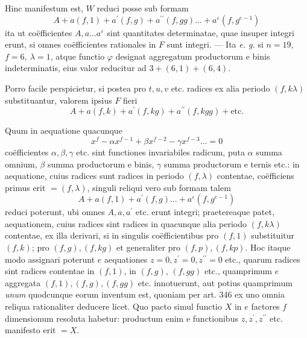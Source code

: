Hinc manifestum est, \(W\) reduci posse sub formam
\[A+a(f,1)+a^{\prime}(f,g)+a^{\prime\prime}(f,gg)\ldots+a^\varepsilon(f,g^{e-1})\] ita ut coëfficientes \(A,\allowbreak a\ldots a^\varepsilon\) sint quantitates determinatae, quae insuper integri erunt, si omnes coëfficientes rationales in \(F\) sunt integri. — Ita \textit{e. g.} si \(n=19\), \(f=6,\allowbreak \ \lambda=1\), atque functio \(\varphi\) designat aggregatum productorum e binis indeterminatis, eius valor reducitur ad \(3+(6,1)+(6,4)\).

Porro facile perspicietur, si postea pro \(t,\allowbreak u,\allowbreak v\) etc. radices ex alia periodo \((f,k\lambda)\) substituantur, valorem ipsius \(F\) fieri \[A+a(f,k)+a^{\prime}(f,kg)+a^{\prime\prime}(f,kgg)+\text{etc.}\]

Quum in aequatione quacunque \[x^f-\alpha x^{f-1}+\beta x^{f-2}-\gamma x^{f-3}\ldots=0\] coëfficientes \(\alpha,\allowbreak \beta,\allowbreak \gamma\) etc. sint functiones invariabiles radicum, puta \(\alpha\) summa omnium, \(\beta\) summa productorum e binis, \(\gamma\) summa productorum e ternis etc.: in aequatione, cuius radices sunt radices in periodo \((f,\lambda)\) contentae, coëfficiens primus erit \(=(f,\lambda)\), singuli reliqui vero sub formam talem \[A+a(f,1)+a^{\prime}(f,g)\ldots+a^\varepsilon(f,g^{e-1})\] reduci poterunt, ubi omnes \(A,\allowbreak a,\allowbreak a^{\prime}\) etc. erunt integri; praetereaque patet, aequationem, cuius radices sint radices in quacunque alia periodo \((f,k\lambda)\) contentae, ex illa derivari, si in singulis coëfficientibus pro \((f,1)\) substituitur \((f,k)\); pro \((f,g),\allowbreak (f,kg)\) et generaliter pro \((f,p),\allowbreak (f,kp)\). Hoc itaque modo assignari poterunt \(e\) aequationes \(z=0,\allowbreak z^{\prime}=0,\allowbreak z^{\prime\prime}=0\) etc., quarum radices sint radices contentae in \((f,1)\), in \((f,g)\), \((f,gg)\) etc., quamprimum \(e\) aggregata \((f,1),\allowbreak (f,g),\allowbreak (f,gg)\) etc. innotuerunt, aut potius quamprimum \textit{unum} quodcunque eorum inventum est, quoniam per art. 346 ex uno omnia reliqua rationaliter deducere licet. Quo pacto simul functio \(X\) in \(e\) factores \(f\) dimensionum resoluta habetur: productum enim e functionibus \(z,\allowbreak z^{\prime},\allowbreak z^{\prime\prime}\) etc. manifesto erit \(=X\).


